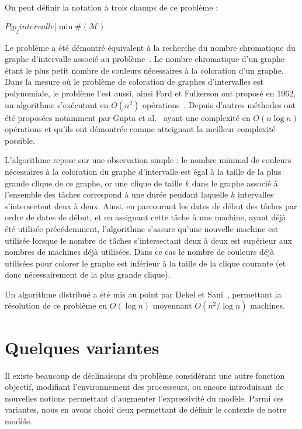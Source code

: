 \documentclass[a4paper,11pt]{report}
\begin{document}
On peut définir la notation à trois champs de ce problème :
\begin{center}
    $\bar{P} \Big| p_j intervalle \Big| \min \#(\mathcal{M})$
\end{center}

Le problème \bisched{} a été démontré équivalent à la recherche du nombre chromatique du graphe d'intervalle
associé au problème~\cite{golumbicalgorithmic}. Le nombre chromatique d'un graphe étant le plus
petit nombre de couleurs nécessaires à la coloration d'un graphe. Dans la mesure où le problème de
coloration de graphes d'intervalles est polynomiale, le problème \bisched{} l'est aussi, ainsi Ford et
Fulkerson ont proposé en 1962, un algorithme s'exécutant en $O(n^2)$
opérations~\cite{ford1962network}. Depuis d'autres méthodes ont été proposées notamment par Gupta et
al.~\cite{gupta_optimal_1978} ayant une complexité en $O(n\log n)$ opérations et qu'ils ont
démontrée comme atteignant la meilleur complexité possible.

L'algorithme repose sur une observation simple : le nombre minimal de couleurs nécessaires à la
coloration du graphe d'intervalle est égal à la taille de la plus grande clique de ce graphe, or une
clique de taille $k$ dans le graphe associé à l'ensemble des tâches correspond à une durée pendant
laquelle $k$ intervalles s'intersectent deux à deux. Ainsi, en parcourant les dates de début des tâches par
ordre de dates de début, et en assignant cette tâche à une machine, ayant déjà été utilisée
précédemment, l'algorithme s'assure qu'une nouvelle machine est utilisée lorsque le nombre de
tâches s'intersectant deux à deux est supérieur aux nombres de machines déjà utilisées. Dans ce cas
le nombre de couleurs déjà utilisées pour colorer le graphe est inférieur à la taille de la clique
courante (et donc nécessairement de la plus grande clique).

Un algorithme distribué a été mis au point par Dekel et Sani~\cite{dekel1983parallel}, permettant la
résolution de ce problème en $O(\log n)$ moyennant $O(n^2 / \log n)$ machines.

\section{Quelques variantes}

Il existe beaucoup de déclinaisons du problème \bisched{} considérant une autre fonction objectif,
modifiant l'environnement des processeurs, ou encore introduisant de nouvelles notions permettant
d'augmenter l'expressivité du modèle. Parmi ces variantes, nous en avons choisi deux permettant de
définir le contexte de notre modèle.
\end{document}
